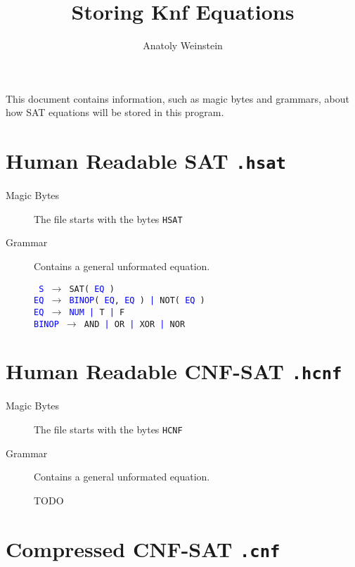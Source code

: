 \documentclass[12pt, letterpaper]{article}
\title{Storing Knf Equations}
\author{Anatoly Weinstein}
\begin{document}
    \maketitle

    This document contains information, such as magic bytes
	and grammars, about how SAT equations will be stored in
	this program.

    \section{Human Readable SAT \texttt{.hsat}}

    \begin{description}
		\item[Magic Bytes] {
        	The file starts with the bytes \texttt{HSAT}
        }
        \item[Grammar] {
        	Contains a general unformated equation.

			\texttt {
				\textcolor{blue}{S} $\rightarrow$ SAT\string( \textcolor{blue}{EQ} \string) \\
				\textcolor{blue}{EQ} $\rightarrow$ \textcolor{blue}{BINOP}\string( \textcolor{blue}{EQ}, \textcolor{blue}{EQ} \string) \textcolor{blue}{|} NOT\string( \textcolor{blue}{EQ} \string) \\
				\textcolor{blue}{EQ} $\rightarrow$ \textcolor{blue}{NUM} \textcolor{blue}{|} T \textcolor{blue}{|} F \\
				\textcolor{blue}{BINOP} $\rightarrow$ AND \textcolor{blue}{|} OR \textcolor{blue}{|} XOR \textcolor{blue}{|} NOR \\
			}
        }
    \end{description}

    \section{Human Readable CNF-SAT \texttt{.hcnf}}

    \begin{description}
		\item[Magic Bytes] {
        	The file starts with the bytes \texttt{HCNF}
        }
        \item[Grammar] {
        	Contains a general unformated equation.

			TODO
        }
    \end{description}

    \section{Compressed CNF-SAT \texttt{.cnf}}
\end{document}
